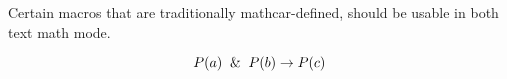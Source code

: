 \documentclass{article}
\begin{document}
Certain macros that are traditionally mathcar-defined, should be usable in both text \And{} math mode.

\[ P(a) \And P(b) \rightarrow P(c) \]
\end{document}
